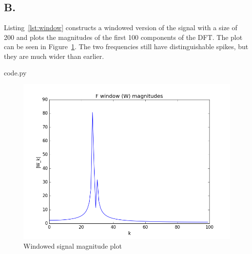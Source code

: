 \subsection*{B.}

Listing~\ref{lst:window} constructs a windowed version of the signal with a size of 200 and plots the magnitudes of the first 100 components of the DFT.
The plot can be seen in Figure~\ref{fig:window}.
The two frequencies still have distinguishable spikes, but they are much wider than earlier.


  {code.py}

\begin{figure}[H]
  \includegraphics[width=\textwidth]{2b}
  \caption{Windowed signal magnitude plot}
  \label{fig:window}
\end{figure}
